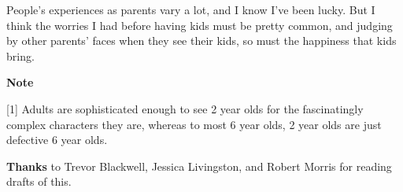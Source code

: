 People's experiences as parents vary a lot, and I know I've been lucky.
But I think the worries I had before having kids must be pretty common,
and judging by other parents' faces when they see their kids, so must
the happiness that kids bring.

\textbf{Note}

{[}1{]} Adults are sophisticated enough to see 2 year olds for the
fascinatingly complex characters they are, whereas to most 6 year olds,
2 year olds are just defective 6 year olds.

\textbf{Thanks} to Trevor Blackwell, Jessica Livingston, and Robert
Morris for reading drafts of this.

